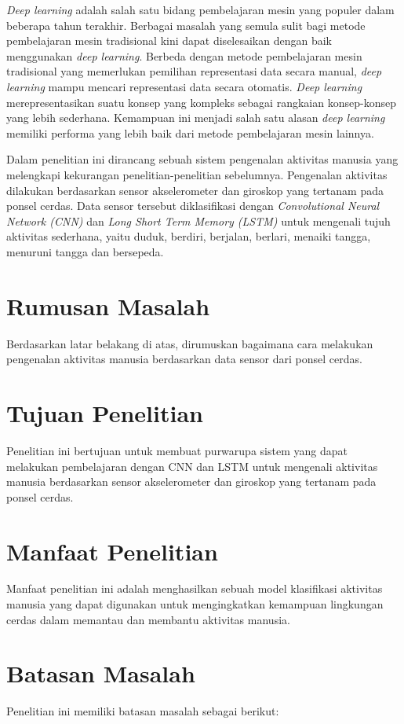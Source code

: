 \emph{Deep learning} adalah salah satu bidang pembelajaran mesin yang populer dalam beberapa tahun terakhir. Berbagai masalah yang semula sulit bagi metode pembelajaran mesin tradisional kini dapat diselesaikan dengan baik menggunakan \emph{deep learning}. Berbeda dengan metode pembelajaran mesin tradisional yang memerlukan pemilihan representasi data secara manual, \emph{deep learning} mampu mencari representasi data secara otomatis. \emph{Deep learning} merepresentasikan suatu konsep yang kompleks sebagai rangkaian konsep-konsep yang lebih sederhana. Kemampuan ini menjadi salah satu alasan \emph{deep learning} memiliki performa yang lebih baik dari metode pembelajaran mesin lainnya.

Dalam penelitian ini dirancang sebuah sistem pengenalan aktivitas manusia yang melengkapi kekurangan penelitian-penelitian sebelumnya. Pengenalan aktivitas dilakukan berdasarkan sensor akselerometer dan giroskop yang tertanam pada ponsel cerdas. Data sensor tersebut diklasifikasi dengan \emph{Convolutional Neural Network (CNN)} dan \emph{Long Short Term Memory (LSTM)} untuk mengenali tujuh aktivitas sederhana, yaitu duduk, berdiri, berjalan, berlari, menaiki tangga, menuruni tangga dan bersepeda.

\section{Rumusan Masalah}
Berdasarkan latar belakang di atas, dirumuskan bagaimana cara melakukan pengenalan aktivitas manusia berdasarkan data sensor dari ponsel cerdas.

\section{Tujuan Penelitian}
Penelitian ini bertujuan untuk membuat purwarupa sistem yang dapat melakukan pembelajaran dengan CNN dan LSTM untuk mengenali aktivitas manusia berdasarkan sensor akselerometer dan giroskop yang tertanam pada ponsel cerdas.

\section{Manfaat Penelitian}
Manfaat penelitian ini adalah menghasilkan sebuah model klasifikasi aktivitas manusia yang dapat digunakan untuk mengingkatkan kemampuan lingkungan cerdas dalam memantau dan membantu aktivitas manusia.

\section{Batasan Masalah}
Penelitian ini memiliki batasan masalah sebagai berikut:

